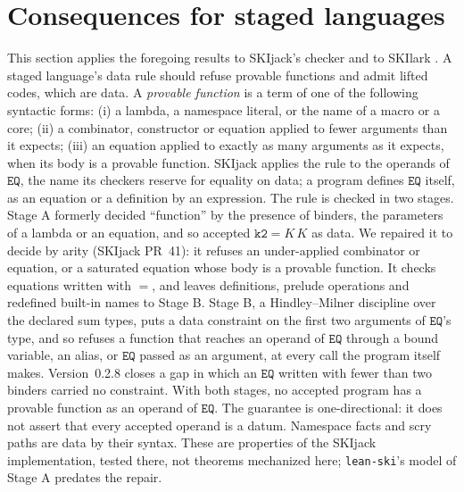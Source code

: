 \documentclass[acmsmall,review,screen]{acmart}\def\acmclass{}
\theoremstyle{plain}
\theoremstyle{definition}
\theoremstyle{remark}
\begin{document}
\section{Consequences for staged languages}\label{sec:skijack}
This section applies the foregoing results to SKIjack's checker \citep{skijack} and to SKIlark \citep{skilark}.
A staged language's data rule should refuse provable functions and admit lifted codes,
which are data.  A \emph{provable function} is a term of one of the following syntactic
forms: (i) a lambda, a namespace literal, or the name of a macro or a core; (ii) a
combinator, constructor or equation applied to fewer arguments than it expects; (iii) an
equation applied to exactly as many arguments as it expects, when its body is a provable
function.  SKIjack applies the rule to the operands of $\mathtt{EQ}$, the name its
checkers reserve for equality on data; a program defines $\mathtt{EQ}$ itself, as an
equation or a definition by an expression.  The rule is checked in two stages.  Stage A
formerly decided ``function'' by the presence of binders, the parameters of a lambda or an
equation, and so accepted $\mathtt{k2} = K\,K$ as data.  We repaired it to decide by arity
(SKIjack PR~41): it refuses an under-applied combinator or equation, or a saturated
equation whose body is a provable function.  It checks equations written with $=$, and
leaves definitions, prelude operations and redefined built-in names to Stage B.  Stage B,
a Hindley--Milner discipline over the declared sum types, puts a data constraint on the
first two arguments of $\mathtt{EQ}$'s type, and so refuses a function that reaches an
operand of $\mathtt{EQ}$ through a bound variable, an alias, or $\mathtt{EQ}$ passed as an
argument, at every call the program itself makes.  Version~0.2.8 closes a gap in which an
$\mathtt{EQ}$ written with fewer than two binders carried no constraint.  With both
stages, no accepted program has a provable function as an operand of $\mathtt{EQ}$.  The
guarantee is one-directional: it does not assert that every accepted operand is a datum.
Namespace facts and scry paths are data by their syntax.  These are properties of the
SKIjack implementation, tested there, not theorems mechanized here; \texttt{lean-ski}'s
model of Stage A predates the repair.
\end{document}
